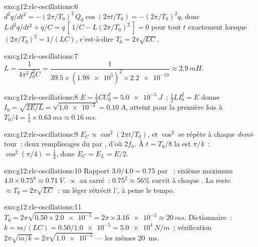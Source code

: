 \begin{solution}{exo:g12:rlc-oscillations:6}
$d^2q/dt^2 = -(2\pi/T_0)^2\,Q_0\cos(2\pi t/T_0) = -(2\pi/T_0)^2 q$,
donc $L\,d^2q/dt^2 + q/C = q\,[\,1/C - L(2\pi/T_0)^2\,] = 0$ pour
tout $t$ exactement lorsque $(2\pi/T_0)^2 = 1/(LC)$, c'est-à-dire
$T_0 = 2\pi\sqrt{LC}$.
\end{solution}

\begin{solution}{exo:g12:rlc-oscillations:7}
$L = \dfrac{1}{4\pi^2 f_0^2 C} = \dfrac{1}{39.5 \times
(\num{1.98e5})^2 \times \num{2.2e-10}} \approx \qty{2.9}{mH}$.
\end{solution}

\begin{solution}{exo:g12:rlc-oscillations:8}
$E = \tfrac12 CU_0^2 = \qty{5.0e-5}{J}$~; $\tfrac12 LI_0^2 = E$ donne
$I_0 = \sqrt{2E/L} = \sqrt{\num{1.0e-2}} = \qty{0.10}{A}$, atteint
pour la première fois à $T_0/4 = \tfrac14 \times \qty{0.63}{ms}
\approx \qty{0.16}{ms}$.
\end{solution}

\begin{solution}{exo:g12:rlc-oscillations:9}
$E_C \propto \cos^2(2\pi t/T_0)$, et $\cos^2$ se répète à chaque
\emph{demi}-tour~: deux remplissages du
 par , d'où
$2f_0$. À $t = T_0/8$ la  est $\pi/4$~:
$\cos^2(\pi/4) = \tfrac12$, donc $E_C = E_L = E/2$.
\end{solution}

\begin{solution}{exo:g12:rlc-oscillations:10}
Rapport $3.0/4.0 = 0.75$ par
~: sixième maximum
$4.0 \times 0.75^6 \approx \qty{0.71}{V}$.
 $\propto$
 au carré~: $0.75^2 \approx 56\%$
survit à chaque . La
 reste $\approx T_0 = 2\pi\sqrt{LC}$~:
un  léger rétrécit
l', à peine le tempo.
\end{solution}

\begin{solution}{exo:g12:rlc-oscillations:11}
$T_0 = 2\pi\sqrt{0.50 \times \num{2.0e-5}} = 2\pi \times
\num{3.16e-3} \approx \qty{20}{ms}$. Dictionnaire~: $k = m/(LC) =
0.50/\num{1.0e-5} = \qty{5.0e4}{N/m}$~; vérification
$2\pi\sqrt{m/k} = 2\pi\sqrt{\num{1.0e-5}}$ --- les mêmes \qty{20}{ms}.
\end{solution}

